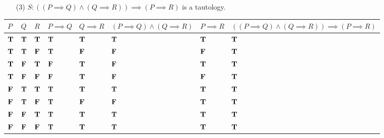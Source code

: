 \begin{example}
\begin{itemize}[itemsep=1em]
\item[(3)] $S:((P \implies Q) \wedge (Q \implies R)) \implies (P \implies R)$ is a tautology.
\end{itemize} 
\begin{center}
{\renewcommand{\arraystretch}{1.5}%
\begin{tabular}{|>{\centering}m{0.5cm}|>{\centering}m{0.5cm}|>{\centering}m{0.5cm}|>{\centering}m{1cm}|>{\centering}m{1cm}|>{\centering}m{3cm}|>{\centering}m{1cm}|>{\centering\arraybackslash}m{5cm}|}
\hline
\rowcolor{lightgrey}
{\footnotesize $P$} & {\footnotesize $Q$} & {\footnotesize $R$} & {\footnotesize $P \implies Q$} & {\footnotesize $Q \implies R$} & {\footnotesize $(P \implies Q) \wedge (Q \implies R)$} & {\footnotesize $P \implies R$} & {\footnotesize $((P \implies Q) \wedge (Q \implies R)) \implies (P \implies R)$}\\
\hline
$\mathbf{T}$ & $\mathbf{T}$ & $\mathbf{T}$ & $\mathbf{T}$ & $\mathbf{T}$ & $\mathbf{T}$ & $\mathbf{T}$ & $\mathbf{T}$\\
\hline
$\mathbf{T}$ & $\mathbf{T}$ & $\mathbf{F}$ & $\mathbf{T}$ & $\mathbf{F}$ & $\mathbf{F}$ & $\mathbf{F}$ & $\mathbf{T}$\\
\hline
$\mathbf{T}$ & $\mathbf{F}$ & $\mathbf{T}$ & $\mathbf{F}$ & $\mathbf{T}$ & $\mathbf{F}$ & $\mathbf{T}$ & $\mathbf{T}$\\
\hline
$\mathbf{T}$ & $\mathbf{F}$ & $\mathbf{F}$ & $\mathbf{F}$ & $\mathbf{T}$ & $\mathbf{F}$ & $\mathbf{F}$ & $\mathbf{T}$\\
\hline
$\mathbf{F}$ & $\mathbf{T}$ & $\mathbf{T}$ & $\mathbf{T}$ & $\mathbf{T}$ & $\mathbf{T}$ & $\mathbf{T}$ & $\mathbf{T}$\\
\hline
$\mathbf{F}$ & $\mathbf{T}$ & $\mathbf{F}$ & $\mathbf{T}$ & $\mathbf{F}$ & $\mathbf{F}$ & $\mathbf{T}$ & $\mathbf{T}$\\
\hline
$\mathbf{F}$ & $\mathbf{F}$ & $\mathbf{T}$ & $\mathbf{T}$ & $\mathbf{T}$ & $\mathbf{T}$ & $\mathbf{T}$ & $\mathbf{T}$\\
\hline
$\mathbf{F}$ & $\mathbf{F}$ & $\mathbf{F}$ & $\mathbf{T}$ & $\mathbf{T}$ & $\mathbf{T}$ & $\mathbf{T}$ & $\mathbf{T}$\\
\hline
\end{tabular}
}
\end{center}
\end{example}

